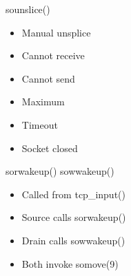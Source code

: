 \documentclass[14pt]{beamer}
\begin{document}
\begin{frame}{sounslice()}
\begin{itemize}
    \item Manual unsplice
    \item Cannot receive
    \item Cannot send
    \item Maximum
    \item Timeout
    \item Socket closed
\end{itemize}
\end{frame}

\begin{frame}{sorwakeup() sowwakeup()}
\begin{itemize}
    \item Called from tcp_input()
    \item Source calls sorwakeup()
    \item Drain calls sowwakeup()
    \item Both invoke somove(9)
\end{itemize}
\end{frame}
\end{document}
